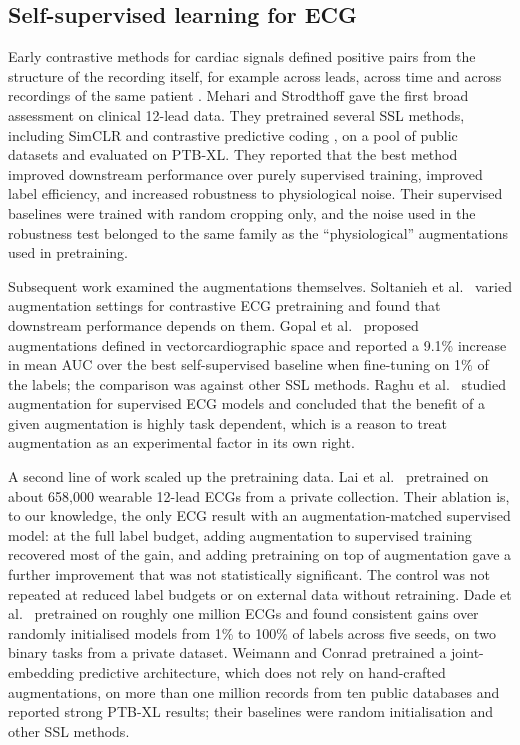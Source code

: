 \documentclass[preprint,12pt]{elsarticle}
\begin{document}
\subsection{Self-supervised learning for ECG}

Early contrastive methods for cardiac signals defined positive pairs from the structure of the recording itself, for example across leads, across time and across recordings of the same patient \cite{kiyasseh2021}. Mehari and Strodthoff \cite{mehari2022} gave the first broad assessment on clinical 12-lead data. They pretrained several SSL methods, including SimCLR \cite{chen2020simclr} and contrastive predictive coding \cite{oord2018cpc}, on a pool of public datasets and evaluated on PTB-XL. They reported that the best method improved downstream performance over purely supervised training, improved label efficiency, and increased robustness to physiological noise. Their supervised baselines were trained with random cropping only, and the noise used in the robustness test belonged to the same family as the ``physiological'' augmentations used in pretraining.

Subsequent work examined the augmentations themselves. Soltanieh et al.\ \cite{soltanieh2022aug} varied augmentation settings for contrastive ECG pretraining and found that downstream performance depends on them. Gopal et al.\ \cite{gopal2021} proposed augmentations defined in vectorcardiographic space and reported a 9.1\% increase in mean AUC over the best self-supervised baseline when fine-tuning on 1\% of the labels; the comparison was against other SSL methods. Raghu et al.\ \cite{raghu2022} studied augmentation for supervised ECG models and concluded that the benefit of a given augmentation is highly task dependent, which is a reason to treat augmentation as an experimental factor in its own right.

A second line of work scaled up the pretraining data. Lai et al.\ \cite{lai2023} pretrained on about 658,000 wearable 12-lead ECGs from a private collection. Their ablation is, to our knowledge, the only ECG result with an augmentation-matched supervised model: at the full label budget, adding augmentation to supervised training recovered most of the gain, and adding pretraining on top of augmentation gave a further improvement that was not statistically significant. The control was not repeated at reduced label budgets or on external data without retraining. Dade et al.\ \cite{dade2026} pretrained on roughly one million ECGs and found consistent gains over randomly initialised models from 1\% to 100\% of labels across five seeds, on two binary tasks from a private dataset. Weimann and Conrad \cite{weimann2025} pretrained a joint-embedding predictive architecture, which does not rely on hand-crafted augmentations, on more than one million records from ten public databases and reported strong PTB-XL results; their baselines were random initialisation and other SSL methods.
\end{document}
